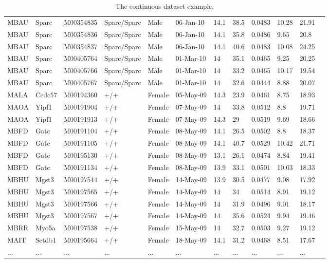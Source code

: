\documentclass[12pt,a4paper]{article}
\begin{document}
\begin{table}
\begin{tabular}{| p{13mm} | p{13mm} | l | l | l | p{19mm}| p{12mm} | l | p{13mm} | p{12mm} | p{12mm} | l |}
MBAU&Sparc&M00354835&Sparc/Sparc&Male&06-Jan-10&14.1&38.5&0.0483&10.28&21.91&\\
MBAU&Sparc&M00354836&Sparc/Sparc&Male&06-Jan-10&14.1&35.8&0.0486&9.65&20.8&\\
MBAU&Sparc&M00354837&Sparc/Sparc&Male&06-Jan-10&14.1&40.6&0.0483&10.08&24.25&\\
MBAU&Sparc&M00405764&Sparc/Sparc&Male&01-Mar-10&14&35.1&0.0465&9.25&20.25&\\
MBAU&Sparc&M00405766&Sparc/Sparc&Male&01-Mar-10&14&33.2&0.0465&10.17&19.54&\\
MBAU&Sparc&M00405767&Sparc/Sparc&Male&01-Mar-10&14&32.6&0.0444&8.88&20.07&\\
MALA&Ccdc57&M00194360&+/+&Female&05-May-09&14.3&23.9&0.0461&8.75&18.93&\\
MAOA&Yipf1&M00191904&+/+&Female&07-May-09&14&33.8&0.0512&8.8&19.71&\\
MAOA&Yipf1&M00191913&+/+&Female&07-May-09&14.3&29&0.0519&9.69&18.66&\\
MBFD&Gatc&M00191104&+/+&Female&08-May-09&14.1&26.5&0.0502&8.8&18.37&\\
MBFD&Gatc&M00191105&+/+&Female&08-May-09&14.1&40.7&0.0529&10.42&21.71&\\
MBFD&Gatc&M00195130&+/+&Female&08-May-09&13.1&26.1&0.0474&8.84&19.41&\\
MBFD&Gatc&M00191134&+/+&Female&08-May-09&13.9&33.1&0.0501&10.03&18.33&\\
MBHU&Mgst3&M00197544&+/+&Female&14-May-09&13.9&30.5&0.0477&9.08&17.92&\\
MBHU&Mgst3&M00197565&+/+&Female&14-May-09&14&34&0.0514&8.91&19.12&\\
MBHU&Mgst3&M00197566&+/+&Female&14-May-09&14&31.9&0.0496&9.01&18.17&\\
MBHU&Mgst3&M00197567&+/+&Female&14-May-09&14&35.6&0.0524&9.94&19.46&\\
MBRR&Myo5a&M00197538&+/+&Female&15-May-09&14&32.7&0.0503&9.27&19.12&\\
MAIT&Setdb1&M00195664&+/+&Female&18-May-09&14.1&31.2&0.0468&8.51&17.67&\\
...&...&...&...&...&...&...&...&...&...&...&\\
\hline  
\end{tabular}
\caption{The continuous dataset example.}\label{table:01}
\end{table}
\end{document}

